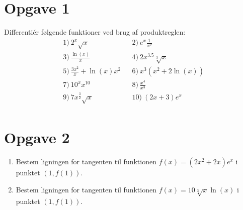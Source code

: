 \section*{Opgave 1}
Differentiér følgende funktioner ved brug af produktreglen:
\begin{align*}
&1) \   2^x\sqrt{x}   &&2) \  e^x\frac{1}{x^2}     \\
&3) \  \frac{\ln(x)}{x}    &&4) \   2x^{3.5}\sqrt[3]{x}    \\
&5) \  \frac{3x^2}{x} + \ln(x)x^2    &&6) \ x^3(x^2+2\ln(x))      \\
&7) \  10^xx^{10}    &&8) \  \frac{x^4}{x^3}     \\
&9) \   7x^{\frac{3}{2}}\sqrt{x}   &&10) \   (2x+3)e^x    \\
\end{align*}
\section*{Opgave 2}
\begin{enumerate}[label=\roman*)]
\item Bestem ligningen for tangenten til funktionen $f(x)=(2x^2+2x)e^x$ i punktet $(1,f(1))$.
\item Bestem ligningen for tangenten til funktionen $f(x) = 10\sqrt[3]{x}\ln(x)$ i punktet $(1,f(1))$.
\end{enumerate}